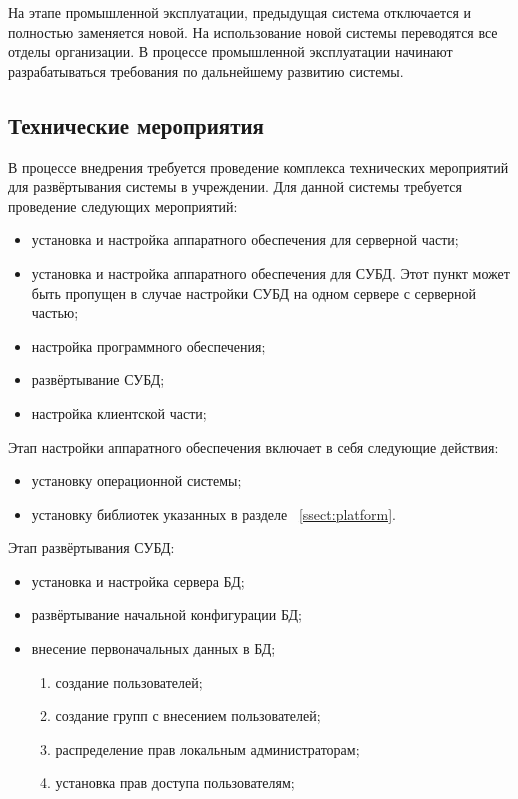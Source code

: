\documentclass[utf8,usehyperref,12pt]{G7-32}
\begin{document}
На этапе промышленной эксплуатации, предыдущая система отключается и полностью заменяется новой. На использование новой системы переводятся все отделы организации. В процессе промышленной эксплуатации начинают разрабатываться требования по дальнейшему развитию системы.

\subsection{Технические мероприятия}

В процессе внедрения требуется проведение комплекса технических мероприятий для развёртывания системы в учреждении. Для данной системы требуется проведение следующих мероприятий:
\begin{itemize}
 \item установка и настройка аппаратного обеспечения для серверной части;
 \item установка и настройка аппаратного обеспечения для СУБД. Этот пункт может быть пропущен в случае настройки СУБД на одном сервере с серверной частью;
 \item настройка программного обеспечения;
 \item развёртывание СУБД;
 \item настройка клиентской части;
\end{itemize} 

Этап настройки аппаратного обеспечения включает в себя следующие действия:
\begin{itemize}
 \item установку операционной системы;
 \item установку библиотек указанных в разделе ~\ref{ssect:platform}.
\end{itemize}

Этап развёртывания СУБД:
\begin{itemize}
 \item установка и настройка сервера БД;
 \item развёртывание начальной конфигурации БД;
 \item внесение первоначальных данных в БД;
 	\begin{enumerate}
 	 \item создание пользователей;
 	 \item создание групп с внесением пользователей;
 	 \item распределение прав локальным администраторам;
 	 \item установка прав доступа пользователям;
 	\end{enumerate}
\end{itemize}
\end{document}

